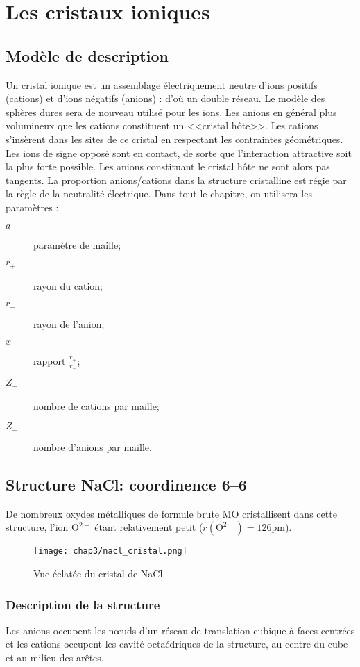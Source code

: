 \chapter{Les cristaux ioniques}
\section{Modèle de description}
Un cristal ionique est un assemblage électriquement neutre d'ions positifs (cations)
et d'ions négatifs (anions) : d'où un double réseau. Le modèle des sphères dures sera
de nouveau utilisé pour les ions.
Les anions en général plus volumineux que les cations constituent un <<cristal hôte>>.
Les cations s’insèrent dans les sites de ce cristal en respectant les contraintes 
géométriques. Les ions de signe opposé sont en contact, de sorte que l'interaction attractive
soit la plus forte possible. Les anions constituant le cristal hôte ne sont alors 
pas tangents. La proportion anions/cations dans la structure cristalline est régie 
par la règle de la neutralité électrique.
Dans tout le chapitre, on utilisera les paramètres :
\begin{description}
    \item[$a$] paramètre de maille;
    \item[$r_+$] rayon du cation;
    \item[$r_-$] rayon de l'anion;
    \item[$x$] rapport $\frac{r_+}{r_-}$;
    \item[$Z_+$] nombre de cations par maille;
    \item[$Z_-$] nombre d'anions par maille.
\end{description}

\section{Structure NaCl: coordinence 6\---6}
De nombreux oxydes métalliques de formule brute MO cristallisent dans cette
structure, l'ion O$^{2-}$ étant relativement petit ($r(\text{O}^{2-}) = 126$pm).

\begin{figure}
    \centering
    \texttt{[image: chap3/nacl\_cristal.png]}
    \caption{Vue éclatée du cristal de NaCl}\label{fig:3_nacl_cristal}
\end{figure}
\subsection{Description de la structure}
Les anions occupent les n\oe uds d'un réseau de translation cubique à faces
centrées et les cations occupent les cavité octaédriques de la structure,
au centre du cube et au milieu des arêtes.\\

